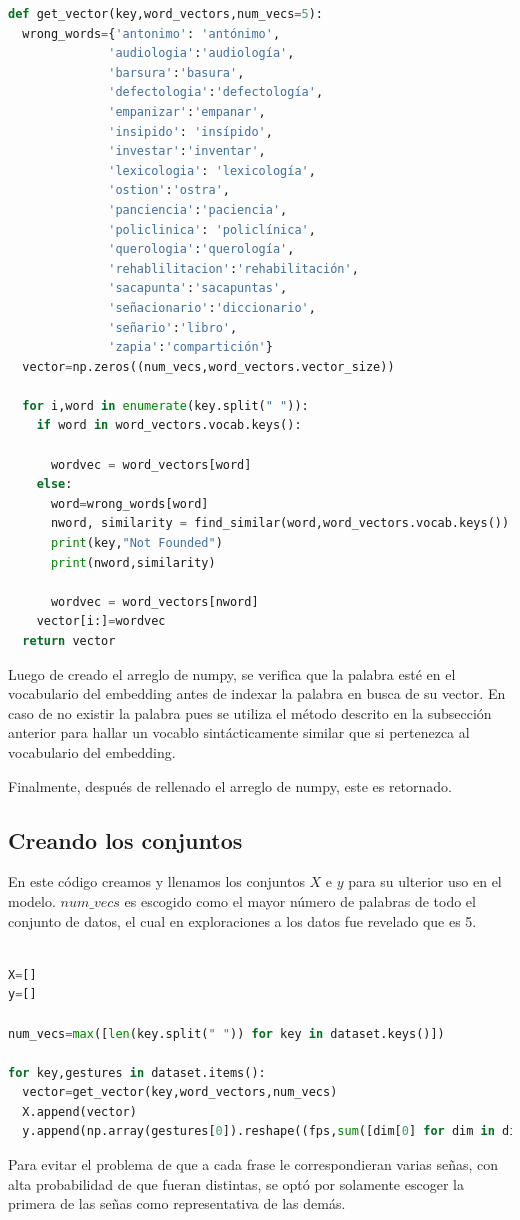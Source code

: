 \begin{lstlisting}[language=Python, caption={Obtener el vector dada una palabra}]
  def get_vector(key,word_vectors,num_vecs=5):
  wrong_words={'antonimo': 'antónimo',
              'audiologia':'audiología',
              'barsura':'basura',
              'defectologia':'defectología',
              'empanizar':'empanar',
              'insipido': 'insípido',
              'investar':'inventar',
              'lexicologia': 'lexicología',
              'ostion':'ostra',
              'panciencia':'paciencia',
              'policlinica': 'policlínica',
              'querologia':'querología',
              'rehablilitacion':'rehabilitación',
              'sacapunta':'sacapuntas',
              'señacionario':'diccionario',
              'señario':'libro', 
              'zapia':'compartición'}
  vector=np.zeros((num_vecs,word_vectors.vector_size))
  
  for i,word in enumerate(key.split(" ")):
    if word in word_vectors.vocab.keys():

      wordvec = word_vectors[word]
    else:
      word=wrong_words[word]
      nword, similarity = find_similar(word,word_vectors.vocab.keys())
      print(key,"Not Founded")
      print(nword,similarity)

      wordvec = word_vectors[nword]
    vector[i:]=wordvec
  return vector
\end{lstlisting}
Luego de creado el arreglo de numpy, se verifica que la palabra esté en el vocabulario del embedding antes de indexar la palabra en busca de su vector. En caso de no existir la palabra pues se utiliza el método descrito en la subsección anterior para hallar un vocablo sintácticamente similar que si pertenezca al vocabulario del embedding.

Finalmente, después de rellenado el arreglo de numpy, este es retornado.

\subsection{Creando los conjuntos}

En este código creamos y llenamos los conjuntos $X$ e $y$ para su ulterior uso en el modelo. $num\_{}vecs$ es escogido como el mayor número de palabras de todo el conjunto de datos, el cual en exploraciones a los datos fue revelado que es 5.

\begin{lstlisting}[language=Python, caption={Crear los conjuntos X e y}]
  
X=[]
y=[]

num_vecs=max([len(key.split(" ")) for key in dataset.keys()])

for key,gestures in dataset.items():
  vector=get_vector(key,word_vectors,num_vecs)
  X.append(vector)
  y.append(np.array(gestures[0]).reshape((fps,sum([dim[0] for dim in dims]),dims[0][1]))) 
\end{lstlisting}
Para evitar el problema de que a cada frase le correspondieran varias señas, con alta probabilidad de que fueran distintas, se optó por solamente escoger la primera de las señas como representativa de las demás.

